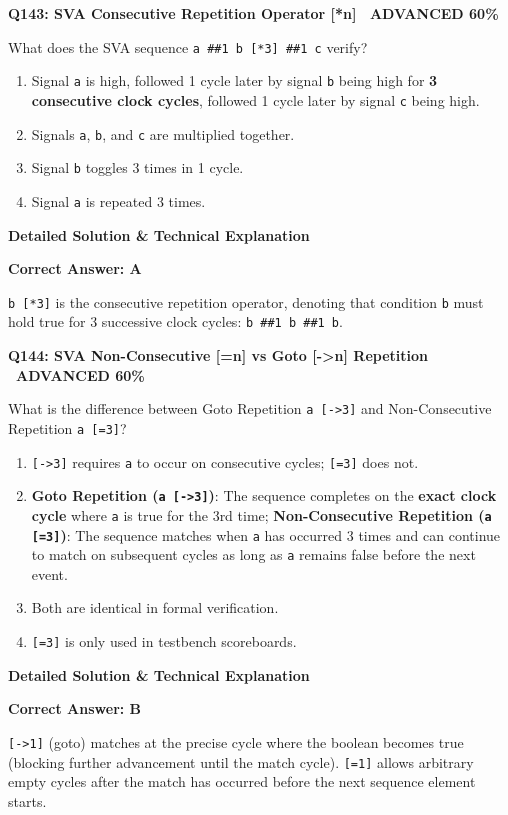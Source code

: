 \documentclass[11pt,a4paper]{article}
\newcommand{\badgeadv}{{\color{white}\colorbox{advred}{\bfseries\sffamily\tiny\ ADVANCED 60\%\ }}}
\newenvironment{qbox}[2]{%
  \begin{mdframed}[style=qstyle]%
  {\bfseries\sffamily\color{primaryblue}#1 \hfill #2}\par\vspace{2pt}%
}{%
  \end{mdframed}%
}
\newenvironment{ansbox}{%
  \begin{mdframed}[style=ansstyle]%
  {\bfseries\sffamily\color{ansgreen}\small Detailed Solution \& Technical Explanation}\par\vspace{2pt}\small%
}{%
  \end{mdframed}%
}
\begin{document}
\begin{qbox}{Q143: SVA Consecutive Repetition Operator [*n]}{\badgeadv}
What does the SVA sequence \texttt{a \#\#1 b [*3] \#\#1 c} verify?
\begin{enumerate}[label=\textbf{\Alph*.}]
  \item Signal \texttt{a} is high, followed 1 cycle later by signal \texttt{b} being high for \textbf{3 consecutive clock cycles}, followed 1 cycle later by signal \texttt{c} being high.
  \item Signals \texttt{a}, \texttt{b}, and \texttt{c} are multiplied together.
  \item Signal \texttt{b} toggles 3 times in 1 cycle.
  \item Signal \texttt{a} is repeated 3 times.
\end{enumerate}
\end{qbox}
\begin{ansbox}
\textbf{Correct Answer: A}

\texttt{b [*3]} is the consecutive repetition operator, denoting that condition \texttt{b} must hold true for 3 successive clock cycles: \texttt{b \#\#1 b \#\#1 b}.
\end{ansbox}

\begin{qbox}{Q144: SVA Non-Consecutive [=n] vs Goto [->n] Repetition}{\badgeadv}
What is the difference between Goto Repetition \texttt{a [->3]} and Non-Consecutive Repetition \texttt{a [=3]}?
\begin{enumerate}[label=\textbf{\Alph*.}]
  \item \texttt{[->3]} requires \texttt{a} to occur on consecutive cycles; \texttt{[=3]} does not.
  \item \textbf{Goto Repetition (\texttt{a [->3]})}: The sequence completes on the \textbf{exact clock cycle} where \texttt{a} is true for the 3rd time; \textbf{Non-Consecutive Repetition (\texttt{a [=3]})}: The sequence matches when \texttt{a} has occurred 3 times and can continue to match on subsequent cycles as long as \texttt{a} remains false before the next event.
  \item Both are identical in formal verification.
  \item \texttt{[=3]} is only used in testbench scoreboards.
\end{enumerate}
\end{qbox}
\begin{ansbox}
\textbf{Correct Answer: B}

\texttt{[->1]} (goto) matches at the precise cycle where the boolean becomes true (blocking further advancement until the match cycle). \texttt{[=1]} allows arbitrary empty cycles after the match has occurred before the next sequence element starts.
\end{ansbox}
\end{document}
